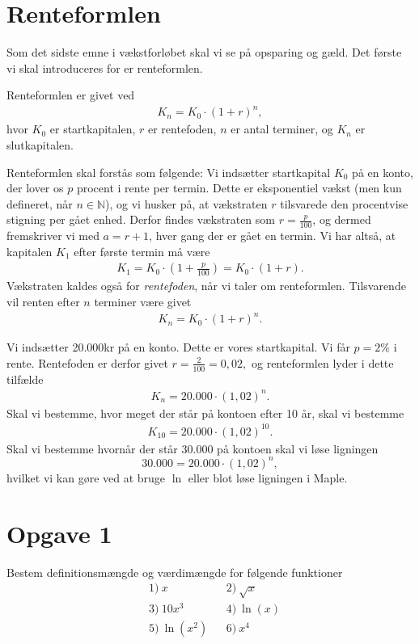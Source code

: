 
\section*{Renteformlen}

Som det sidste emne i vækstforløbet skal vi se på opsparing og gæld. Det første vi skal introduceres for er renteformlen.
\begin{defn}
Renteformlen er givet ved 
\begin{align*}
K_n = K_0\cdot (1+r)^n, 
\end{align*}
hvor $K_0$ er startkapitalen, $r$ er rentefoden, $n$ er antal terminer, og $K_n$ er slutkapitalen. 
\end{defn}

Renteformlen skal forstås som følgende: Vi indsætter startkapital $K_0$ på en konto, der lover os $p$ procent i rente per termin. Dette er eksponentiel vækst (men kun defineret, når $n\in \mathbb{N}$), og vi husker på, at vækstraten $r$ tilsvarede den procentvise stigning per gået enhed. Derfor findes vækstraten som $r = \frac{p}{100}$, og dermed fremskriver vi med $a = r+1$, hver gang der er gået en termin. Vi har altså, at kapitalen $K_1$ efter første termin må være
\begin{align*}
K_1 = K_0\cdot (1+\frac{p}{100})   = K_0\cdot (1+r).
\end{align*}
Vækstraten kaldes også for \textit{rentefoden}, når vi taler om renteformlen. Tilsvarende vil renten efter $n$ terminer være givet
\begin{align*}
K_n = K_0\cdot (1+r)^n.
\end{align*}
\begin{exa}
Vi indsætter 20.000kr på en konto. Dette er vores startkapital. Vi får $p=2\%$ i rente. Rentefoden er derfor givet $r = \frac{2}{100} = 0,02,$ og renteformlen lyder i dette tilfælde
\begin{align*}
K_n = 20.000\cdot (1,02)^n.
\end{align*}
Skal vi bestemme, hvor meget der står på kontoen efter 10 år, skal vi bestemme 
\begin{align*}
K_{10} = 20.000\cdot (1,02)^{10}.
\end{align*}
Skal vi bestemme hvornår der står $30.000$ på kontoen skal vi løse ligningen
\[
30.000 = 20.000\cdot (1,02)^n,
\]
hvilket vi kan gøre ved at bruge $\ln$ eller blot løse ligningen i Maple.
\end{exa}
\section*{Opgave 1}
Bestem definitionsmængde og værdimængde for følgende funktioner
\begin{align*}
&1) \ x  &&2) \ \sqrt{x}  \\
&3) \ 10x^3  &&4) \ \ln(x)  \\
&5) \  \ln(x^2) &&6) \ x^4   \\
\end{align*}
